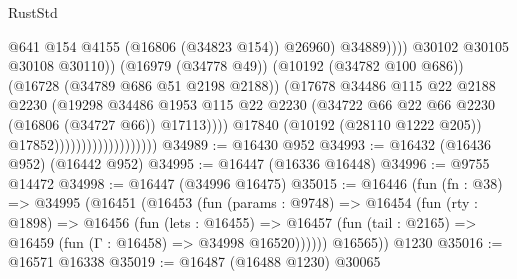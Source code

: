 \begin{lexlean}{RustStd}
\begin{coremodule}
                                                          @641
                                                          @154
                                                          @4155
                                                          (@16806 (@34823 @154))
                                                          @26960)
                                                        @34889))))
                                                @30102
                                                @30105
                                                @30108
                                                @30110))
                                            (@16979 (@34778 @49))
                                            (@10192 (@34782 @100 @686))
                                            (@16728 (@34789 @686 @51 @2198 @2188))
                                            (@17678
                                              @34486
                                              @115
                                              @22
                                              @2188
                                              @2230
                                              (@19298
                                                @34486
                                                @1953
                                                @115
                                                @22
                                                @2230
                                                (@34722
                                                  @66
                                                  @22
                                                  @66
                                                  @2230
                                                  (@16806 (@34727 @66))
                                                  @17113))))
                                          @17840
                                          (@10192 (@28110 @1222 @205))
                                          @17852)))))))))))))))))))
@34989 := @16430 @952
@34993 := @16432 (@16436 @952) (@16442 @952)
@34995 := @16447 (@16336 @16448)
@34996 := @9755 @14472
@34998 := @16447 (@34996 @16475)
@35015 := @16446
    (fun (fn : @38) =>
    @34995
      (@16451
        (@16453
          (fun (params : @9748) =>
          @16454
            (fun (rty : @1898) =>
            @16456
              (fun (lets : @16455) =>
              @16457 (fun (tail : @2165) => @16459 (fun (Γ : @16458) => @34998 @16520))))))
        @16565))
    @1230
@35016 := @16571 @16338
@35019 := @16487 (@16488 @1230) @30065

\end{coremodule}
\end{lexlean}
